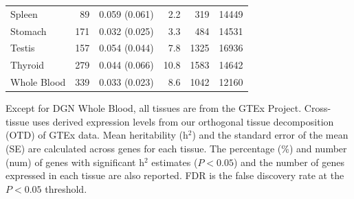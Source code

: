 \documentclass[10pt,letterpaper]{article}
\begin{document}
\begin{table}[!ht]
\begin{adjustwidth}{-2.25in}{0in}
\begin{tabular}{lrlrrr}
  Spleen & 89 & 0.059 (0.061) & 2.2 & 319 & 14449 \\ 
  Stomach & 171 & 0.032 (0.025) & 3.3 & 484 & 14531 \\ 
  Testis & 157 & 0.054 (0.044) & 7.8 & 1325 & 16936 \\ 
  Thyroid & 279 & 0.044 (0.066) & 10.8 & 1583 & 14642 \\ 
  Whole Blood & 339 & 0.033 (0.023) & 8.6 & 1042 & 12160 \\ 
   \hline\end{tabular}
\begin{flushleft} Except for DGN Whole Blood, all tissues are from the GTEx Project. Cross-tissue uses derived expression levels from our orthogonal tissue decomposition (OTD) of GTEx data. Mean heritability (h$^2$) and the standard error of the mean (SE) are calculated across genes for each tissue. The percentage (\%) and number (num) of genes with significant h$^2$ estimates ($P<0.05$) and the number of genes expressed in each tissue are also reported. FDR is the false discovery rate at the $P<0.05$ threshold.
\end{flushleft}
\label{table-h2}
\end{adjustwidth}
\end{table}

\clearpage
\end{document}
